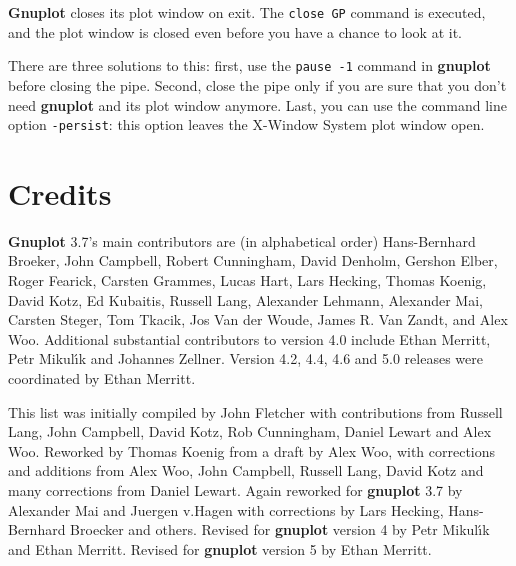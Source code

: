 \documentclass[a4paper,11pt]{article}
\newcommand{\gnuplot}{\textbf{gnuplot }}
\newcommand{\Gnuplot}{\textbf{Gnuplot }}
\begin{document}
\Gnuplot{} closes its plot window on exit. The \verb+close GP+
command is executed, and the plot window is closed even before you have
a chance to look at it.

There are three solutions to this: first, use the \verb+pause -1+
command in \gnuplot before closing the pipe. Second, close the pipe
only if you are sure that you don't need \gnuplot and its plot window
anymore. Last, you can use the command line option \verb+-persist+: this
option leaves the X-Window System plot window open.


\section{Credits}

\Gnuplot{} 3.7's main contributors are (in alphabetical order)
Hans-Bernhard Broeker, John Campbell, Robert Cunningham, David Denholm,
Gershon Elber, Roger Fearick, Carsten Grammes, Lucas Hart, Lars Hecking,
Thomas Koenig, David Kotz, Ed Kubaitis, Russell Lang, Alexander Lehmann,
Alexander Mai, Carsten Steger, Tom Tkacik, Jos Van der Woude, James R.
Van Zandt, and Alex Woo.  Additional substantial contributors to version 4.0
include Ethan Merritt, Petr Mikul\'{\i}k and Johannes Zellner.
Version 4.2, 4.4, 4.6 and 5.0 releases were coordinated by Ethan Merritt.

This list was initially compiled by John Fletcher with contributions
from Russell Lang, John Campbell, David Kotz, Rob Cunningham, Daniel
Lewart and Alex Woo. Reworked by Thomas Koenig from a draft
by Alex Woo, with corrections and additions from Alex Woo, John
Campbell, Russell Lang, David Kotz and many corrections from Daniel Lewart.
Again reworked for \gnuplot 3.7 by Alexander Mai and Juergen v.Hagen
with corrections by Lars Hecking, Hans-Bernhard Broecker and others.
Revised for \gnuplot version 4 by Petr Mikul\'{\i}k and Ethan Merritt.
Revised for \gnuplot version 5 by Ethan Merritt.
\end{document}

